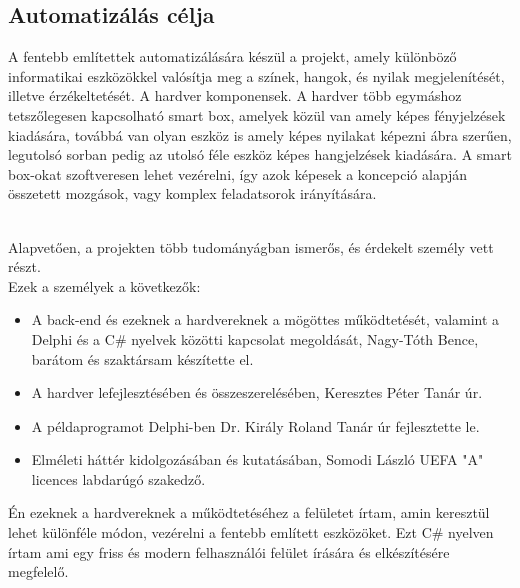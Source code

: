 \documentclass[tocnopagenum]{thesis-ekf}
\theoremstyle{definition}
\theoremstyle{remark}
\begin{document}
	\subsection{Automatizálás célja}
	A fentebb említettek automatizálására készül a projekt, amely különböző informatikai eszközökkel valósítja meg a színek, hangok, és nyilak megjelenítését, illetve érzékeltetését. 
	A hardver komponensek. A hardver több egymáshoz tetszőlegesen kapcsolható smart box, amelyek közül van amely képes fényjelzések kiadására, továbbá van olyan eszköz is amely képes nyilakat képezni ábra szerűen, legutolsó sorban pedig az utolsó féle eszköz képes hangjelzések kiadására. A smart box-okat szoftveresen lehet vezérelni, így azok képesek a koncepció alapján összetett mozgások, vagy komplex feladatsorok irányítására.

	\\
	Alapvetően, a projekten több tudományágban ismerős, és érdekelt személy vett részt. 
	\\
	Ezek a személyek a következők:
	\begin{itemize}
		\item A back-end és ezeknek a hardvereknek a mögöttes működtetését, valamint a Delphi és a C\# nyelvek közötti kapcsolat megoldását, Nagy-Tóth Bence, barátom és szaktársam készítette el.
		\item A hardver lefejlesztésében és összeszerelésében, Keresztes Péter Tanár úr. 
		\item A példaprogramot Delphi-ben Dr. Király Roland Tanár úr fejlesztette le. 
		\item Elméleti háttér kidolgozásában és kutatásában, Somodi László UEFA "A" licences labdarúgó szakedző.
	\end{itemize}

	
	Én ezeknek a hardvereknek a működtetéséhez a felületet írtam, amin keresztül lehet különféle módon, vezérelni a fentebb említett eszközöket. %
	Ezt C\# nyelven írtam ami egy friss és modern felhasználói felület írására és elkészítésére megfelelő.
	
	

\end{document}
